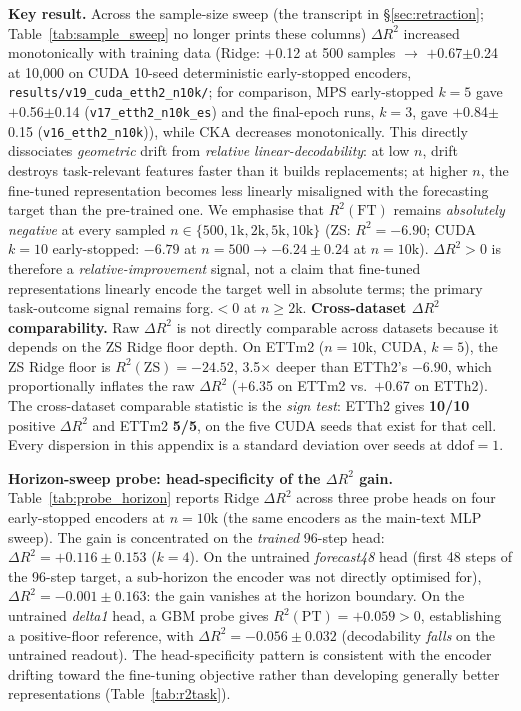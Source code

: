 \textbf{Key result.}
Across the sample-size sweep (the transcript in \S\ref{sec:retraction};
Table~\ref{tab:sample_sweep} no longer prints these columns)
$\Delta R^2$ increased monotonically with training data
(Ridge: $+$0.12 at 500 samples $\rightarrow$ $+$0.67$\pm$0.24
at 10{,}000 on CUDA 10-seed deterministic early-stopped encoders,
\texttt{results/v19\_cuda\_etth2\_n10k/}; for comparison, MPS early-stopped
$k{=}5$ gave $+$0.56$\pm$0.14 (\texttt{v17\_etth2\_n10k\_es}) and the
final-epoch runs, $k{=}3$, gave $+$0.84$\pm$0.15
(\texttt{v16\_etth2\_n10k})), while CKA decreases monotonically.
This directly dissociates \emph{geometric} drift from
\emph{relative linear-decodability}: at low $n$, drift destroys
task-relevant features faster than it builds replacements;
at higher $n$, the fine-tuned representation becomes less
linearly misaligned with the forecasting target than the
pre-trained one.
We emphasise that $R^2(\text{FT})$ remains
\emph{absolutely negative} at every sampled
$n \in \{500, 1\text{k}, 2\text{k}, 5\text{k}, 10\text{k}\}$
(ZS: $R^2{=}-6.90$; CUDA $k{=}10$ early-stopped: $-6.79$ at $n{=}500 \to -6.24{\pm}0.24$
at $n{=}10$k).  $\Delta R^2 {>} 0$ is therefore a
\emph{relative-improvement} signal, not a claim that
fine-tuned representations linearly encode the target well
in absolute terms; the primary task-outcome signal remains
forg.$<0$ at $n{\geq}2$k.
\textbf{Cross-dataset $\Delta R^2$ comparability.}
Raw $\Delta R^2$ is not directly comparable across datasets because
it depends on the ZS Ridge floor depth.
On ETTm2 ($n{=}10$k, CUDA, $k{=}5$), the ZS Ridge floor is
$R^2(\text{ZS}){=}-24.52$, 3.5$\times$ deeper than ETTh2's
$-6.90$, which proportionally inflates the raw $\Delta R^2$
($+$6.35 on ETTm2 vs.\ $+$0.67 on ETTh2).
The cross-dataset comparable statistic is the \emph{sign test}: ETTh2 gives
\textbf{10/10} positive $\Delta R^2$ and ETTm2 \textbf{5/5}, on the five CUDA
seeds that exist for that cell.  Every dispersion in this appendix is a standard
deviation over seeds at $\text{ddof}{=}1$.

\textbf{Horizon-sweep probe: head-specificity of the $\Delta R^2$ gain.}
Table~\ref{tab:probe_horizon} reports Ridge $\Delta R^2$ across three
probe heads on four early-stopped encoders at $n{=}10$k (the
same encoders as the main-text MLP sweep).  The gain is concentrated
on the \emph{trained} 96-step head: $\Delta R^2{=}{+}0.116{\pm}0.153$
($k{=}4$).  On the untrained \emph{forecast48} head (first 48 steps
of the 96-step target, a sub-horizon the encoder was not directly
optimised for), $\Delta R^2 {=} {-}0.001{\pm}0.163$: the gain
vanishes at the horizon boundary.  On the untrained \emph{delta1}
head, a GBM probe gives $R^2(\text{PT}){=}{+}0.059{>}0$, establishing
a positive-floor reference, with $\Delta R^2{=}{-}0.056{\pm}0.032$
(decodability \emph{falls} on the untrained readout).
The head-specificity pattern is consistent with the encoder drifting
toward the fine-tuning objective rather than developing generally
better representations (Table~\ref{tab:r2task}).

